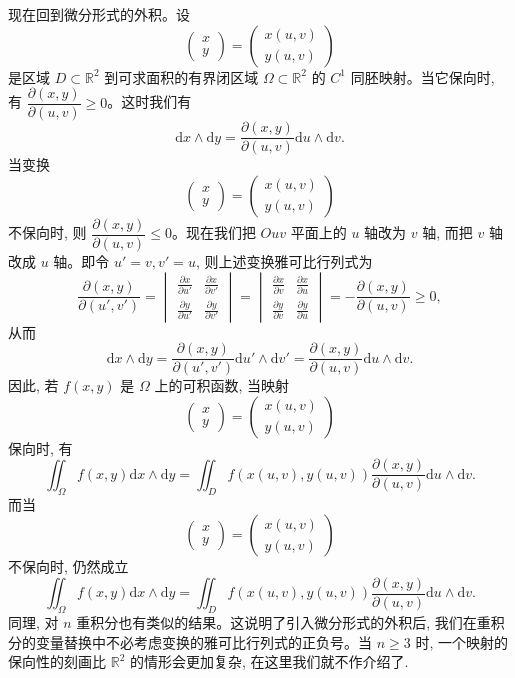 \begin{solve}
现在回到微分形式的外积。设
\[
  \begin{pmatrix}x\\y\end{pmatrix}
  =
  \begin{pmatrix}x(u,v)\\y(u,v)\end{pmatrix}
\]
是区域 $D\subset\mathbb R^2$ 到可求面积的有界闭区域 $\Omega\subset\mathbb R^2$ 的 $C^1$ 同胚映射。当它保向时, 有 $\dfrac{\partial(x,y)}{\partial(u,v)}\geqslant0$。这时我们有
\[
  \mathrm dx\wedge\mathrm dy
  =\frac{\partial(x,y)}{\partial(u,v)}\mathrm du\wedge\mathrm dv.
\]
当变换
\[
  \begin{pmatrix}x\\y\end{pmatrix}
  =
  \begin{pmatrix}x(u,v)\\y(u,v)\end{pmatrix}
\]
不保向时, 则 $\dfrac{\partial(x,y)}{\partial(u,v)}\leqslant0$。现在我们把 $Ouv$ 平面上的 $u$ 轴改为 $v$ 轴, 而把 $v$ 轴改成 $u$ 轴。即令 $u'=v,v'=u$, 则上述变换雅可比行列式为
\[
  \frac{\partial(x,y)}{\partial(u',v')}
  =
  \begin{vmatrix}
    \frac{\partial x}{\partial u'}&\frac{\partial x}{\partial v'}\\
    \frac{\partial y}{\partial u'}&\frac{\partial y}{\partial v'}
  \end{vmatrix}
  =
  \begin{vmatrix}
    \frac{\partial x}{\partial v}&\frac{\partial x}{\partial u}\\
    \frac{\partial y}{\partial v}&\frac{\partial y}{\partial u}
  \end{vmatrix}
  =-\frac{\partial(x,y)}{\partial(u,v)}\geqslant0,
\]
从而
\[
  \mathrm dx\wedge\mathrm dy
  =\frac{\partial(x,y)}{\partial(u',v')}\mathrm du'\wedge\mathrm dv'
  =\frac{\partial(x,y)}{\partial(u,v)}\mathrm du\wedge\mathrm dv.
\]
因此, 若 $f(x,y)$ 是 $\Omega$ 上的可积函数, 当映射
\[
  \begin{pmatrix}x\\y\end{pmatrix}
  =
  \begin{pmatrix}x(u,v)\\y(u,v)\end{pmatrix}
\]
保向时, 有
\[
  \iint_\Omega f(x,y)\mathrm dx\wedge\mathrm dy
  =
  \iint_D f(x(u,v),y(u,v))\frac{\partial(x,y)}{\partial(u,v)}\mathrm du\wedge\mathrm dv.
\]
而当
\[
  \begin{pmatrix}x\\y\end{pmatrix}
  =
  \begin{pmatrix}x(u,v)\\y(u,v)\end{pmatrix}
\]
不保向时, 仍然成立
\[
  \iint_\Omega f(x,y)\mathrm dx\wedge\mathrm dy
  =
  \iint_D f(x(u,v),y(u,v))\frac{\partial(x,y)}{\partial(u,v)}\mathrm du\wedge\mathrm dv.
\]
同理, 对 $n$ 重积分也有类似的结果。这说明了引入微分形式的外积后, 我们在重积分的变量替换中不必考虑变换的雅可比行列式的正负号。当 $n\geqslant3$ 时, 一个映射的保向性的刻画比 $\mathbb R^2$ 的情形会更加复杂, 在这里我们就不作介绍了.
\end{solve}


